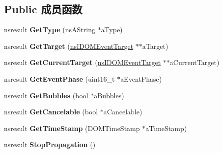 \subsection*{Public 成员函数}
\begin{DoxyCompactItemize}
\item 
\mbox{\label{interfacens_i_d_o_m_event_ae548d401a638046c3978d8b81a51dd08}} 
nsresult {\bfseries Get\+Type} (\hyperlink{structns_string_container}{ns\+A\+String} $\ast$a\+Type)
\item 
\mbox{\label{interfacens_i_d_o_m_event_a28c289be475c6e261729da2719e67fe1}} 
nsresult {\bfseries Get\+Target} (\hyperlink{interfacens_i_d_o_m_event_target}{ns\+I\+D\+O\+M\+Event\+Target} $\ast$$\ast$a\+Target)
\item 
\mbox{\label{interfacens_i_d_o_m_event_a7e048adc67c5dc2ff33faf183e750df0}} 
nsresult {\bfseries Get\+Current\+Target} (\hyperlink{interfacens_i_d_o_m_event_target}{ns\+I\+D\+O\+M\+Event\+Target} $\ast$$\ast$a\+Current\+Target)
\item 
\mbox{\label{interfacens_i_d_o_m_event_a3018feaef6322050af4cd8b93e0fd73b}} 
nsresult {\bfseries Get\+Event\+Phase} (uint16\+\_\+t $\ast$a\+Event\+Phase)
\item 
\mbox{\label{interfacens_i_d_o_m_event_add49ae43d9059637e4b690436afdd47b}} 
nsresult {\bfseries Get\+Bubbles} (bool $\ast$a\+Bubbles)
\item 
\mbox{\label{interfacens_i_d_o_m_event_a8ec34671c29e12c5fcb61a36abe4bc66}} 
nsresult {\bfseries Get\+Cancelable} (bool $\ast$a\+Cancelable)
\item 
\mbox{\label{interfacens_i_d_o_m_event_a39c36b2e1b0af55e228684feffd9a96b}} 
nsresult {\bfseries Get\+Time\+Stamp} (D\+O\+M\+Time\+Stamp $\ast$a\+Time\+Stamp)
\item 
\mbox{\label{interfacens_i_d_o_m_event_a610b7e5cd282c47bb2118a40fa758c08}} 
nsresult {\bfseries Stop\+Propagation} ()
\item 
\mbox{\label{interfacens_i_d_o_m_event_a9a09c60c3b0ffc4ca258aa85c1824eeb}} 

\end{DoxyCompactItemize}
